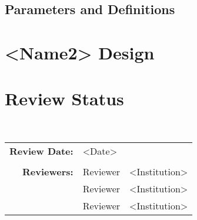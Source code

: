 \documentclass[]{article}
\begin{document}
\subsection{Parameters and Definitions}




\section{<Name2> Design}


\section{Review Status}

 \\

\begin{tabular}{r p{1.3in} p{2in}}
{\bf Review Date:} & <Date> \\ \\
{\bf Reviewers:}   & Reviewer           & <Institution> \\
                   & Reviewer           & <Institution> \\
                   & Reviewer           & <Institution>
\end{tabular}



 

\end{document}
